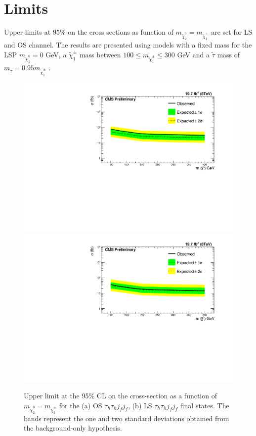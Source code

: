 \clearpage 

\section{Limits}


Upper limits at $95\%$ on the cross sections as function of $m_{\tilde{\chi}_{2}^{0}}=m_{\tilde{\chi}_{1}^{\pm}}$ are set for LS and OS channel. The results are presented using models with a fixed mass for the LSP $m_{\tilde{\chi}_{1}^{0}} = 0 $ GeV, a $\tilde{\chi}_{1}^{\pm}$ mass between $100 \leq m_{\tilde{\chi}_{1}^{\pm}} \leq 300$ GeV and a $\tilde{\tau}$ mass of $m_{\tilde{\tau}} = 0.95 m_{\tilde{\chi}_{1}^{\pm}}$ .

\begin{figure}
	\begin{center}
		\includegraphics[angle=0,width=.48\textwidth, height=0.35\textheight]{PLOTS/Limit_VBF_diTau_OS.pdf}
		\includegraphics[angle=0,width=.48\textwidth, height=0.35\textheight]{PLOTS/Limit_VBF_diTau_LS.pdf}
		\caption{Upper limit at the 95\% CL on the cross-section as a function of 
			$m_{\tilde{\chi}_{2}^{0}}=m_{\tilde{\chi}_{1}^{\pm}}$ for the (a) OS 
			$\tau_{h}\tau_{h} j_{f} j_{f}$, (b) LS $\tau_{h}\tau_{h} j_{f} j_{f}$
			final states. The bands represent the one and two standard deviations obtained from the background-only hypothesis.}
		\label{fig:LimitsOSLS}
	\end{center}
\end{figure}


